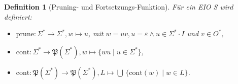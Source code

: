 \documentclass[mathserif]{beamer}
\newtheorem{Def}{Definition}
\newcommand{\EIO}{EIO}
\newcommand{\prune}{\ensuremath{\mathrm{prune}}}
\newcommand{\cont}{\ensuremath{\mathrm{cont}}}
\begin{document}
\begin{frame}
  \begin{Def}[Pruning- und Fortsetzungs-Funktion]
    Für ein \EIO{} S wird definiert:
    \begin{itemize}
      \item $\prune :\Sigma ^*\rightarrow\Sigma ^*, w\mapsto u$, mit $w=uv,
        u=\varepsilon \wedge u\in\Sigma ^* \cdot I$ und $v\in O^*$,
      \item $\cont :\Sigma ^*\rightarrow \mathfrak{P}(\Sigma ^*), w\mapsto
        \{wu\mid u\in\Sigma ^*\}$,
      \item $\cont :\mathfrak{P}(\Sigma ^*)\rightarrow \mathfrak{P}(\Sigma ^*),
        L\mapsto \bigcup\,\{\cont (w)\mid w\in L\}$.
    \end{itemize}
  \end{Def}
\end{frame}
\end{document}
